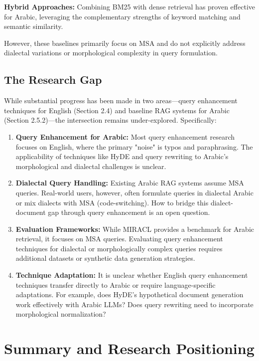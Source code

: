 \textbf{Hybrid Approaches:} Combining BM25 with dense retrieval has proven effective for Arabic, leveraging the complementary strengths of keyword matching and semantic similarity.

However, these baselines primarily focus on MSA and do not explicitly address dialectal variations or morphological complexity in query formulation.

\subsection{The Research Gap}

While substantial progress has been made in two areas—query enhancement techniques for English (Section 2.4) and baseline RAG systems for Arabic (Section 2.5.2)—the intersection remains under-explored. Specifically:

\begin{enumerate}
    \item \textbf{Query Enhancement for Arabic:} Most query enhancement research focuses on English, where the primary "noise" is typos and paraphrasing. The applicability of techniques like HyDE and query rewriting to Arabic's morphological and dialectal challenges is unclear.
    
    \item \textbf{Dialectal Query Handling:} Existing Arabic RAG systems assume MSA queries. Real-world users, however, often formulate queries in dialectal Arabic or mix dialects with MSA (code-switching). How to bridge this dialect-document gap through query enhancement is an open question.
    
    \item \textbf{Evaluation Frameworks:} While MIRACL provides a benchmark for Arabic retrieval, it focuses on MSA queries. Evaluating query enhancement techniques for dialectal or morphologically complex queries requires additional datasets or synthetic data generation strategies.
    
    \item \textbf{Technique Adaptation:} It is unclear whether English query enhancement techniques transfer directly to Arabic or require language-specific adaptations. For example, does HyDE's hypothetical document generation work effectively with Arabic LLMs? Does query rewriting need to incorporate morphological normalization?
\end{enumerate}

\section{Summary and Research Positioning}

